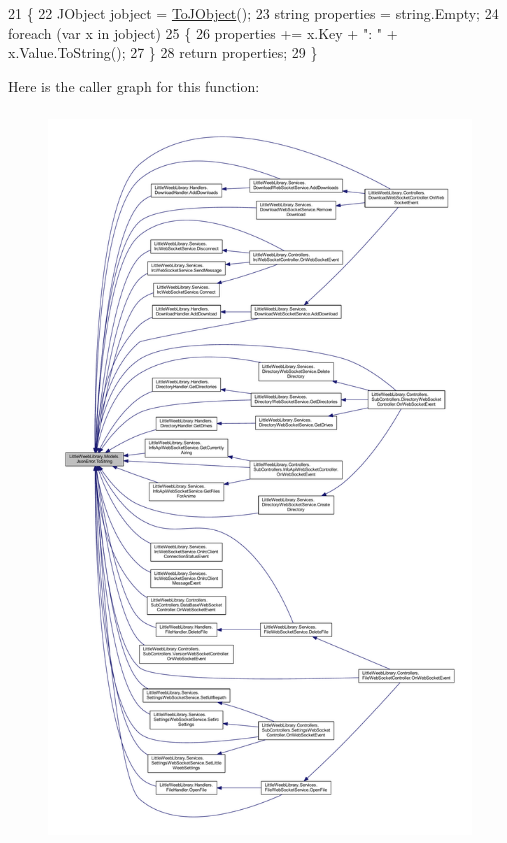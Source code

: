 \begin{DoxyCode}
21         \{
22             JObject jobject = \mbox{\hyperlink{class_little_weeb_library_1_1_models_1_1_json_error_a0623b835bb68d5d5e1f591df6a09dd81}{ToJObject}}();
23             \textcolor{keywordtype}{string} properties = \textcolor{keywordtype}{string}.Empty;
24             \textcolor{keywordflow}{foreach} (var x \textcolor{keywordflow}{in} jobject)
25             \{
26                 properties += x.Key + \textcolor{stringliteral}{": "} + x.Value.ToString();
27             \}
28             \textcolor{keywordflow}{return} properties;
29         \}
\end{DoxyCode}
Here is the caller graph for this function\+:\nopagebreak
\begin{figure}[H]
\begin{center}
\leavevmode
\includegraphics[height=550pt]{class_little_weeb_library_1_1_models_1_1_json_error_ad7d5522c90119111d2e929f39e7f6d3c_icgraph}
\end{center}
\end{figure}
\mbox{\label{class_little_weeb_library_1_1_models_1_1_json_error_a0623b835bb68d5d5e1f591df6a09dd81}} 
